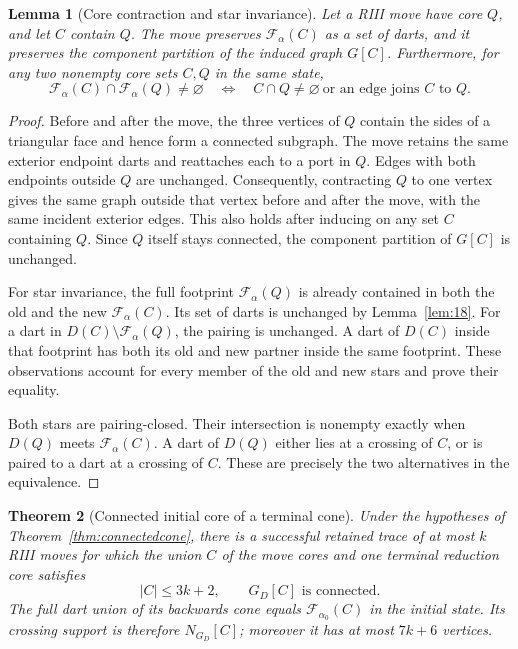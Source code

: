 \documentclass[11pt]{article}
\newtheorem{theorem}{Theorem}[section]
\newtheorem{lemma}[theorem]{Lemma}
\theoremstyle{definition}
\begin{document}
\begin{lemma}[Core contraction and star invariance]
\label{lem:star}
Let a RIII move have core $Q$, and let $C$ contain $Q$. The move preserves
$\mathcal F_\alpha(C)$ as a set of darts, and it preserves the component
partition of the induced graph $G[C]$. Furthermore, for any two nonempty
core sets $C,Q$ in the same state,
\[
 \mathcal F_\alpha(C)\cap\mathcal F_\alpha(Q)\ne\varnothing
 \quad\Longleftrightarrow\quad
 C\cap Q\ne\varnothing\ \text{or an edge joins }C\text{ to }Q.
\]
\end{lemma}

\begin{proof}
Before and after the move, the three vertices of $Q$ contain the sides of
a triangular face and hence form a connected subgraph. The move retains
the same exterior endpoint darts and reattaches each to a port in $Q$.
Edges with both endpoints outside $Q$ are unchanged. Consequently,
contracting $Q$ to one vertex gives the same graph outside that vertex
before and after the move, with the same incident exterior edges. This
also holds after inducing on any set $C$ containing $Q$. Since $Q$
itself stays connected, the component partition of $G[C]$ is unchanged.

For star invariance, the full footprint $\mathcal F_\alpha(Q)$ is already
contained in both the old and the new $\mathcal F_\alpha(C)$. Its set of
darts is unchanged by Lemma~\ref{lem:18}. For a dart in
$D(C)\setminus\mathcal F_\alpha(Q)$, the pairing is unchanged. A dart
of $D(C)$ inside that footprint has both its old and new partner inside
the same footprint. These observations account for every member of the
old and new stars and prove their equality.

Both stars are pairing-closed. Their intersection is nonempty exactly
when $D(Q)$ meets $\mathcal F_\alpha(C)$. A dart of $D(Q)$ either lies
at a crossing of $C$, or is paired to a dart at a crossing of $C$.
These are precisely the two alternatives in the equivalence.
\end{proof}

\begin{theorem}[Connected initial core of a terminal cone]
\label{thm:core}
Under the hypotheses of Theorem~\ref{thm:connectedcone}, there is a
successful retained trace of at most $k$ RIII moves for which the union
$C$ of the move cores and one terminal reduction core satisfies
\begin{equation}
 |C|\le3k+2,\qquad G_D[C]\text{ is connected}.
 \label{eq:corebound}
\end{equation}
The full dart union of its backwards cone equals
$\mathcal F_{\alpha_0}(C)$ in the initial state. Its crossing support is
therefore $N_{G_D}[C]$; moreover it has at most $7k+6$ vertices.
\end{theorem}
\end{document}
